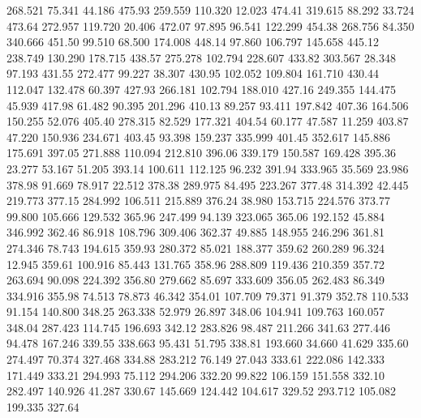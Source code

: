  268.521   75.341   44.186       475.93
 259.559  110.320   12.023       474.41
 319.615   88.292   33.724       473.64
 272.957  119.720   20.406       472.07
  97.895   96.541  122.299       454.38
 268.756   84.350  340.666       451.50
  99.510   68.500  174.008       448.14
  97.860  106.797  145.658       445.12
 238.749  130.290  178.715       438.57
 275.278  102.794  228.607       433.82
 303.567   28.348   97.193       431.55
 272.477   99.227   38.307       430.95
 102.052  109.804  161.710       430.44
 112.047  132.478   60.397       427.93
 266.181  102.794  188.010       427.16
 249.355  144.475   45.939       417.98
  61.482   90.395  201.296       410.13
  89.257   93.411  197.842       407.36
 164.506  150.255   52.076       405.40
 278.315   82.529  177.321       404.54
  60.177   47.587   11.259       403.87
  47.220  150.936  234.671       403.45
  93.398  159.237  335.999       401.45
 352.617  145.886  175.691       397.05
 271.888  110.094  212.810       396.06
 339.179  150.587  169.428       395.36
  23.277   53.167   51.205       393.14
 100.611  112.125   96.232       391.94
 333.965   35.569   23.986       378.98
  91.669   78.917   22.512       378.38
 289.975   84.495  223.267       377.48
 314.392   42.445  219.773       377.15
 284.992  106.511  215.889       376.24
  38.980  153.715  224.576       373.77
  99.800  105.666  129.532       365.96
 247.499   94.139  323.065       365.06
 192.152   45.884  346.992       362.46
  86.918  108.796  309.406       362.37
  49.885  148.955  246.296       361.81
 274.346   78.743  194.615       359.93
 280.372   85.021  188.377       359.62
 260.289   96.324   12.945       359.61
 100.916   85.443  131.765       358.96
 288.809  119.436  210.359       357.72
 263.694   90.098  224.392       356.80
 279.662   85.697  333.609       356.05
 262.483   86.349  334.916       355.98
  74.513   78.873   46.342       354.01
 107.709   79.371   91.379       352.78
 110.533   91.154  140.800       348.25
 263.338   52.979   26.897       348.06
 104.941  109.763  160.057       348.04
 287.423  114.745  196.693       342.12
 283.826   98.487  211.266       341.63
 277.446   94.478  167.246       339.55
 338.663   95.431   51.795       338.81
 193.660   34.660   41.629       335.60
 274.497   70.374  327.468       334.88
 283.212   76.149   27.043       333.61
 222.086  142.333  171.449       333.21
 294.993   75.112  294.206       332.20
  99.822  106.159  151.558       332.10
 282.497  140.926   41.287       330.67
 145.669  124.442  104.617       329.52
 293.712  105.082  199.335       327.64
